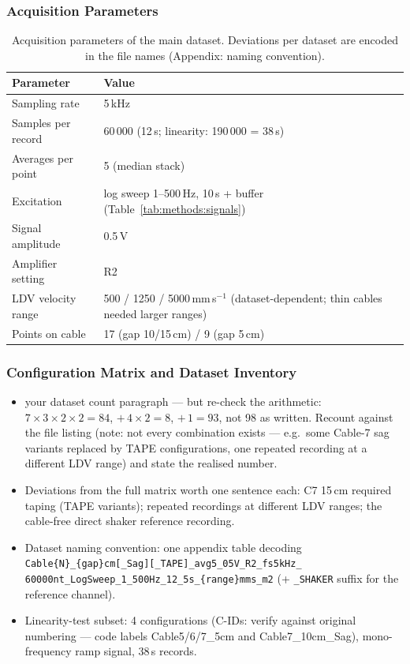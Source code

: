 \subsubsection{Acquisition Parameters}
\begin{table}[H]
  \centering
  \begin{tabularx}{\textwidth}{l X}
    \toprule
    \textbf{Parameter} & \textbf{Value} \\
    \midrule
    Sampling rate & 5\,kHz \\
    Samples per record & 60\,000 (12\,s; linearity: 190\,000 = 38\,s) \\
    Averages per point & 5 (median stack) \\
    Excitation & log sweep 1–500\,Hz, 10\,s + buffer
      (Table~\ref{tab:methods:signals}) \\
    Signal amplitude & 0.5\,V \\
    Amplifier setting & R2 \\
    LDV velocity range & 500 / 1250 / 5000\,mm\,s$^{-1}$ (dataset-dependent;
      thin cables needed larger ranges) \\
    Points on cable & 17 (gap 10/15\,cm) / 9 (gap 5\,cm) \\
    \bottomrule
  \end{tabularx}
  \caption[Acquisition parameters]{Acquisition parameters of the main
    dataset. Deviations per dataset are encoded in the file names
    (Appendix: naming convention).}
  \label{tab:methods:acqparams}
\end{table}

\subsubsection{Configuration Matrix and Dataset Inventory}
\begin{itemize}
  \item [KEEP] your dataset count paragraph — but re-check the arithmetic:
    $7 \times 3 \times 2 \times 2 = 84$, $+\,4 \times 2 = 8$, $+\,1 = 93$,
    not 98 as written. Recount against the file listing (note: not every
    combination exists — e.g.\ some Cable-7 sag variants replaced by TAPE
    configurations, one repeated recording at a different LDV range) and
    state the realised number.
  \item Deviations from the full matrix worth one sentence each: C7 15\,cm
    required taping (TAPE variants); repeated recordings at different LDV
    ranges; the cable-free direct shaker reference recording.
  \item Dataset naming convention: one appendix table decoding
    \texttt{Cable\{N\}\_\{gap\}cm[\_Sag][\_TAPE]\_avg5\_05V\_R2\_fs5kHz\_%
60000nt\_LogSweep\_1\_500Hz\_12\_5s\_\{range\}mms\_m2} (+ \texttt{\_SHAKER}
    suffix for the reference channel).
  \item Linearity-test subset: 4 configurations (C-IDs: verify against
    original numbering — code labels Cable5/6/7\_5cm and Cable7\_10cm\_Sag),
    mono-frequency ramp signal, 38\,s records.
\end{itemize}

